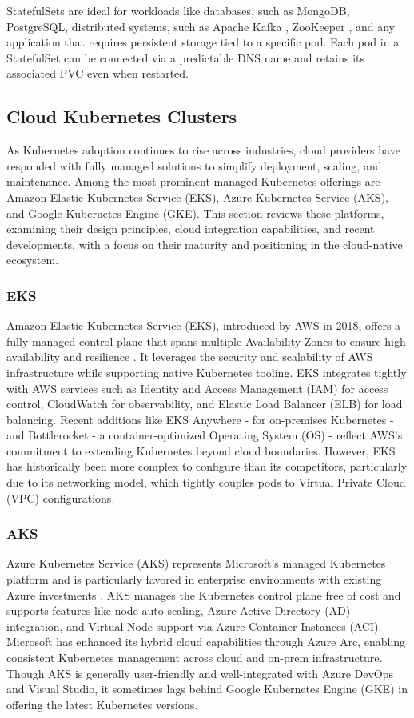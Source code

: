 StatefulSets are ideal for workloads like databases, such as MongoDB, PostgreSQL, distributed systems, such as Apache Kafka \cite{kreps2011}, ZooKeeper \cite{zookeeper-docs}, and any application that requires persistent storage tied to a specific pod. Each pod in a StatefulSet can be connected via a predictable DNS name and retains its associated PVC even when restarted.

\subsection{Cloud Kubernetes Clusters}
As Kubernetes adoption continues to rise across industries, cloud providers have responded with fully managed solutions to simplify deployment, scaling, and maintenance. Among the most prominent managed Kubernetes offerings are Amazon Elastic Kubernetes Service (EKS), Azure Kubernetes Service (AKS), and Google Kubernetes Engine (GKE). This section reviews these platforms, examining their design principles, cloud integration capabilities, and recent developments, with a focus on their maturity and positioning in the cloud-native ecosystem.

\subsubsection{EKS}
Amazon Elastic Kubernetes Service (EKS), introduced by AWS in 2018, offers a fully managed control plane that spans multiple Availability Zones to ensure high availability and resilience \cite{aws-docs}. It leverages the security and scalability of AWS infrastructure while supporting native Kubernetes tooling. EKS integrates tightly with AWS services such as Identity and Access Management (IAM) for access control, CloudWatch for observability, and Elastic Load Balancer (ELB) for load balancing. Recent additions like EKS Anywhere - for on-premises Kubernetes - and Bottlerocket - a container-optimized Operating System (OS) - reflect AWS's commitment to extending Kubernetes beyond cloud boundaries. However, EKS has historically been more complex to configure than its competitors, particularly due to its networking model, which tightly couples pods to Virtual Private Cloud (VPC) configurations.

\subsubsection{AKS}
Azure Kubernetes Service (AKS) represents Microsoft's managed Kubernetes platform and is particularly favored in enterprise environments with existing Azure investments \cite{azure-docs}. AKS manages the Kubernetes control plane free of cost and supports features like node auto-scaling, Azure Active Directory (AD) integration, and Virtual Node support via Azure Container Instances (ACI). Microsoft has enhanced its hybrid cloud capabilities through Azure Arc, enabling consistent Kubernetes management across cloud and on-prem infrastructure. Though AKS is generally user-friendly and well-integrated with Azure DevOps and Visual Studio, it sometimes lags behind Google Kubernetes Engine (GKE) in offering the latest Kubernetes versions.

